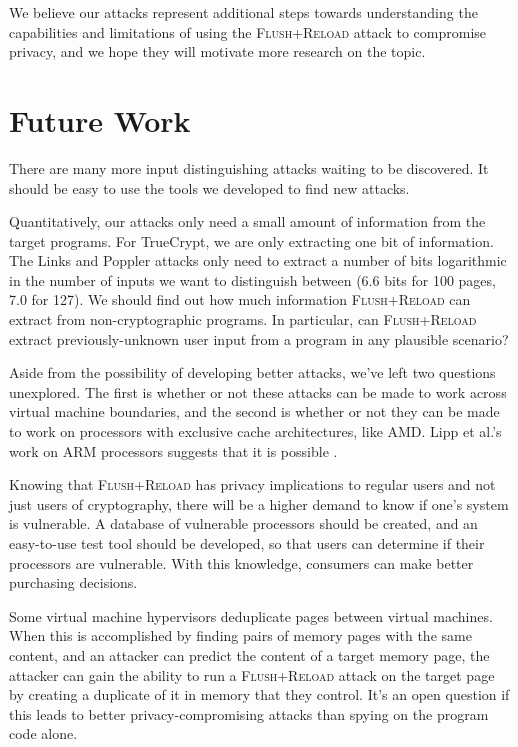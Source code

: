 \documentclass[letterpaper,twocolumn,10pt]{article}
\begin{document}
We believe our attacks represent additional steps towards understanding the
capabilities and limitations of using the \textsc{Flush+Reload} attack to
compromise privacy, and we hope they will motivate more research on the topic.

\section{Future Work}
\label{sec:future}

There are many more input distinguishing attacks waiting to be discovered. It
should be easy to use the tools we developed to find new attacks.

Quantitatively, our attacks only need a small amount of information from the
target programs. For TrueCrypt, we are only extracting one bit of information.
The Links and Poppler attacks only need to extract a number of bits logarithmic
in the number of inputs we want to distinguish between (6.6 bits for 100 pages,
7.0 for 127). We should find out how much information \textsc{Flush+Reload} can
extract from non-cryptographic programs. In particular, can
\textsc{Flush+Reload} extract previously-unknown user input from a program in
any plausible scenario?

Aside from the possibility of developing better attacks, we've left two
questions unexplored. The first is whether or not these attacks can be made to
work across virtual machine boundaries, and the second is whether or not they
can be made to work on processors with exclusive cache architectures, like AMD.
Lipp et al.'s work on ARM processors suggests that it is possible
\cite{lipp2015armageddon}.

Knowing that \textsc{Flush+Reload} has privacy implications to regular users and
not just users of cryptography, there will be a higher demand to know if one's
system is vulnerable. A database of vulnerable processors should be created, and
an easy-to-use test tool should be developed, so that users can determine if
their processors are vulnerable. With this knowledge, consumers can make better
purchasing decisions.

Some virtual machine hypervisors deduplicate pages between virtual machines.
When this is accomplished by finding pairs of memory pages with the same
content, and an attacker can predict the content of a target memory page, the
attacker can gain the ability to run a \textsc{Flush+Reload} attack on the
target page by creating a duplicate of it in memory that they control. It's an
open question if this leads to better privacy-compromising attacks than spying
on the program code alone.
\end{document}

